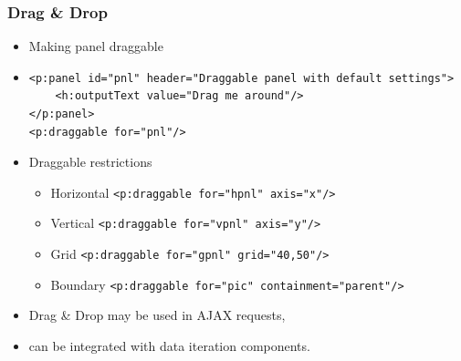\documentclass[10pt,xcolor=pdflatex]{beamer}
\begin{document}
\begin{frame}[containsverbatim]\frametitle{Drag \& Drop}
  \begin{itemize}
    \item Making panel draggable
	\item[] \begin{footnotesize} \begin{verbatim}
<p:panel id="pnl" header="Draggable panel with default settings">
    <h:outputText value="Drag me around"/>
</p:panel>
<p:draggable for="pnl"/>
	\end{verbatim} \end{footnotesize}
    \item Draggable restrictions
	  \begin{itemize}
        \item Horizontal {\footnotesize \verb;<p:draggable for="hpnl" axis="x"/>;}
		\item Vertical {\footnotesize \verb;<p:draggable for="vpnl" axis="y"/>;}
		\item Grid {\footnotesize \verb;<p:draggable for="gpnl" grid="40,50"/>;}
		\item Boundary {\footnotesize \verb;<p:draggable for="pic" containment="parent"/>;}
	  \end{itemize}
  \end{itemize}
  \begin{itemize}
    \item Drag \& Drop may be used in AJAX requests,
	\item can be integrated with data iteration components.
  \end{itemize}
\end{frame}
\end{document}
